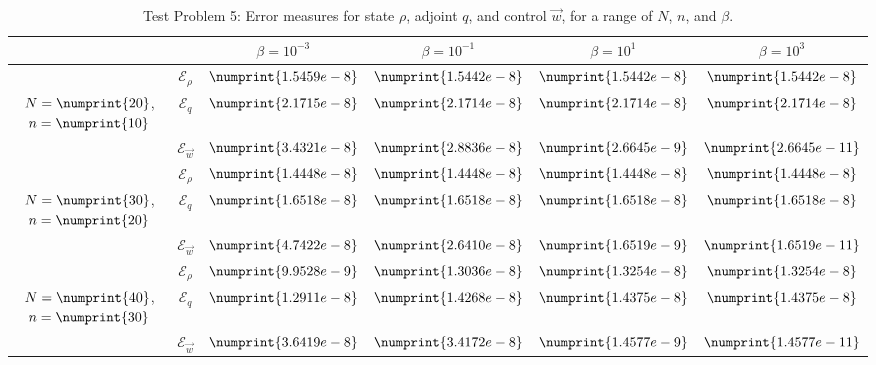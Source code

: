 \documentclass[11pt, a4paper]{article}
\theoremstyle{definition}
\newcommand{\adj}{q}
\begin{document}
\begin{table}
	\begin{tabular}{ | c | c || c | c | c | c ||}
		\hline
		\multicolumn{2}{|c||}{} & $\beta = 10^{-3}$ & $\beta = 10^{-1}$ & $\beta = 10^{1}$ & $\beta = 10^{3}$  \\
		\hline
		\hline
		& $\mathcal{E}_\rho$ & $\numprint{1.5459e-8}$ & $\numprint{1.5442e-8}$ & $\numprint{1.5442e-8}$ & $\numprint{1.5442e-8}$ \\
		$N = \numprint{20}$, $n = \numprint{10}$  & $\mathcal{E}_\adj$ & $\numprint{2.1715e-8}$ & $\numprint{2.1714e-8}$ & $\numprint{2.1714e-8}$ & $\numprint{2.1714e-8}$ \\
		& $\mathcal{E}_{\vec{w}}$ & $\numprint{3.4321e-8}$ & $\numprint{2.8836e-8}$ & $\numprint{2.6645e-9}$ & $\numprint{2.6645e-11}$ \\
		\hline
		& $\mathcal{E}_\rho$ & $\numprint{1.4448e-8}$ & $\numprint{1.4448e-8}$ & $\numprint{1.4448e-8}$ & $\numprint{1.4448e-8}$ \\
		$N = \numprint{30}$, $n = \numprint{20}$  & $\mathcal{E}_\adj$ & $\numprint{1.6518e-8}$ & $\numprint{1.6518e-8}$ & $\numprint{1.6518e-8}$ & $\numprint{1.6518e-8}$ \\
		& $\mathcal{E}_{\vec{w}}$ & $\numprint{4.7422e-8}$ & $\numprint{2.6410e-8}$ & $\numprint{1.6519e-9}$ & $\numprint{1.6519e-11}$ \\
		\hline
		& $\mathcal{E}_\rho$ & $\numprint{9.9528e-9}$ & $\numprint{1.3036e-8}$ & $\numprint{1.3254e-8}$ & $\numprint{1.3254e-8}$ \\
		$N = \numprint{40}$, $n = \numprint{30}$  & $\mathcal{E}_\adj$ & $\numprint{1.2911e-8}$ & $\numprint{1.4268e-8}$ & $\numprint{1.4375e-8}$ & $\numprint{1.4375e-8}$ \\
		& $\mathcal{E}_{\vec{w}}$ & $\numprint{3.6419e-8}$ & $\numprint{3.4172e-8}$ & $\numprint{1.4577e-9}$ & $\numprint{1.4577e-11}$ \\
		\hline
	\end{tabular}
	\caption{Test Problem 5: Error measures for state $\rho$, adjoint $\adj$, and control $\vec{w}$, for a range of $N$, $n$, and $\beta$.}
	\label{TabA1:Prob5}
\end{table}
\end{document}
